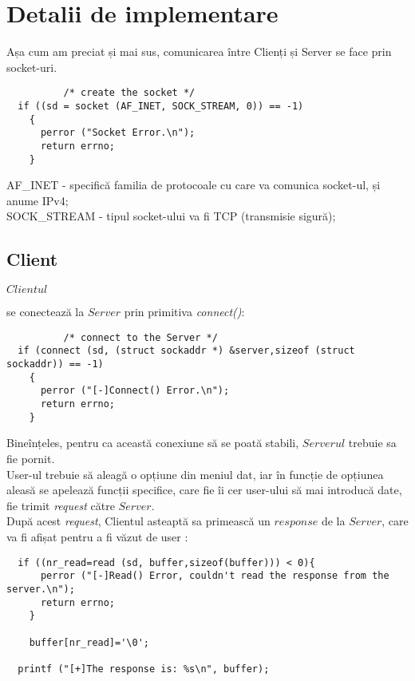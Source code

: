 \documentclass{article}
\begin{document}
 \section{Detalii de implementare}
 Așa cum am preciat și mai sus, comunicarea între Clienți și Server se face prin socket-uri.
     \begin{verbatim} 
          /* create the socket */
  if ((sd = socket (AF_INET, SOCK_STREAM, 0)) == -1)
    {
      perror ("Socket Error.\n");
      return errno;
    }
    \end{verbatim} 
AF\_INET - specifică familia de protocoale cu care va comunica socket-ul, și anume IPv4;\\
SOCK\_STREAM - tipul socket-ului va fi TCP (transmisie sigură);\\
 \subsection{Client}
\hypertarget{sec:detailsConnect}{$Clientul$} se conectează la $Server$ prin primitiva \textit{connect()}:

    \begin{verbatim}
          /* connect to the Server */
  if (connect (sd, (struct sockaddr *) &server,sizeof (struct sockaddr)) == -1)
    {
      perror ("[-]Connect() Error.\n");
      return errno;
    }
    \end{verbatim}
 Bineînțeles, pentru ca această conexiune să se poată stabili, $Serverul$ trebuie sa fie pornit.\\
 User-ul trebuie să aleagă o opțiune din meniul dat, iar în funcție de opțiunea aleasă se apelează funcții specifice, care fie îi cer user-ului să mai introducă date, fie trimit \textit{request} către $Server$.\\
 După acest \textit{request}, Clientul asteaptă sa primească un $response$ de la $Server$, care va fi afișat pentru a fi văzut de user : 
 \begin{verbatim}
  if ((nr_read=read (sd, buffer,sizeof(buffer))) < 0){
      perror ("[-]Read() Error, couldn't read the response from the server.\n");
      return errno;
    }

    buffer[nr_read]='\0';
    
  printf ("[+]The response is: %s\n", buffer);
    \end{verbatim}
 
\end{document}
